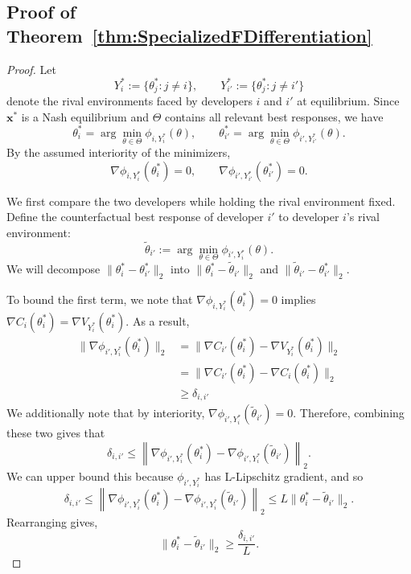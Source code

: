 \subsection{Proof of Theorem~\ref{thm:SpecializedFDifferentiation}}
\label{app:SpecializedFDifferentiation}
\SpecializedFDifferentiation*

\begin{proof}
Let
\[
    Y_i^*
    :=
    \{\theta_j^*:j\neq i\},
    \qquad
    Y_{i'}^*
    :=
    \{\theta_j^*:j\neq i'\}
\]
denote the rival environments faced by developers $i$ and $i'$ at
equilibrium. Since $\mathbf x^*$ is a Nash equilibrium and $\Theta$
contains all relevant best responses, we have
\[
    \theta_i^*
    =
    \arg\min_{\theta\in\Theta}
    \phi_{i,Y_i^*}(\theta),
    \qquad
    \theta_{i'}^*
    =
    \arg\min_{\theta\in\Theta}
    \phi_{i',Y_{i'}^*}(\theta).
\]
By the assumed interiority of the minimizers,
\[
    \nabla \phi_{i,Y_i^*}(\theta_i^*)=0,
    \qquad
    \nabla \phi_{i',Y_{i'}^*}(\theta_{i'}^*)=0.
\]

We first compare the two developers while holding the rival environment
fixed. Define the counterfactual best response of developer $i'$ to
developer $i$'s rival environment:
\[
    \widetilde\theta_{i'}
    :=
    \arg\min_{\theta\in\Theta}
    \phi_{i',Y_i^*}(\theta).
\]
We will decompose $\lVert \theta^*_i-\theta^*_{i'} \rVert_2$ into $\lVert \theta^*_i-\widetilde{\theta}_{i'} \rVert_2$ and $\lVert \widetilde{\theta}_{i'} -\theta^*_{i'}\rVert_2$.

To bound the first term, we note that $\nabla\phi_{i,Y_i^*}(\theta_i^*)=0$ implies $\nabla C_{i}(\theta_{i}^*) = \nabla V_{Y_{i}^*}(\theta_{i}^*)$. 
As a result, 
\[
\begin{aligned}
    \lVert \nabla\phi_{i',Y_i^*}(\theta_i^*) \rVert_2
    &=
    \lVert\nabla C_{i'}(\theta_i^*)
    -
    \nabla V_{Y_i^*}(\theta_i^*) \rVert_2\\
    &=
    \lVert \nabla C_{i'}(\theta_i^*)
    -
    \nabla C_i(\theta_i^*) \rVert_2 \\
    & \geq \delta_{i,i'} 
\end{aligned}
\]
We additionally note that by interiority, $\nabla\phi_{i',Y_i^*}(\widetilde\theta_{i'})=0$. 
Therefore, combining these two gives that 
\[
 \delta_{i,i'}
    \le
    \left\|
    \nabla\phi_{i',Y_i^*}(\theta_i^*)
    -
    \nabla\phi_{i',Y_i^*}(\widetilde\theta_{i'})
    \right\|_2.
\]
We can upper bound this because $\phi_{i',Y_{i}^*}$ has L-Lipschitz gradient, and so 
\[
 \delta_{i,i'}
    \le
    \left\|
    \nabla\phi_{i',Y_i^*}(\theta_i^*)
    -
    \nabla\phi_{i',Y_i^*}(\widetilde\theta_{i'})
    \right\|_2 \leq  L\|\theta_i^*-\widetilde\theta_{i'}\|_2.
\]
Rearranging gives,
\[
    \|\theta_i^*-\widetilde\theta_{i'}\|_2
    \ge
    \frac{\delta_{i,i'}}{L}.
\]


\end{proof}
